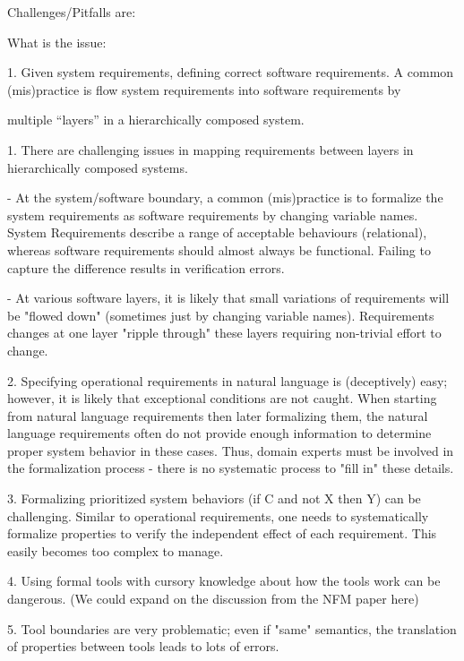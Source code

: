 Challenges/Pitfalls are:

What is the issue:

1. Given system requirements, defining correct software requirements.  A common (mis)practice is flow system requirements into software requirements by

multiple ``layers'' in a hierarchically composed system.


1. There are challenging issues in mapping requirements between layers in hierarchically composed systems.

- At the system/software boundary, a common (mis)practice is to formalize the system requirements as software requirements by changing variable names. System Requirements describe a range of acceptable behaviours (relational), whereas software requirements should almost always be functional. Failing to capture the difference results in verification errors.

- At various software layers, it is likely that small variations of requirements will be "flowed down" (sometimes just by changing variable names).  Requirements changes at one layer "ripple through" these layers requiring non-trivial effort to change.

2. Specifying operational requirements in natural language is (deceptively) easy; however, it is likely that exceptional conditions are not caught.  When starting from natural language requirements then later formalizing them, the natural language requirements often do not provide enough information to determine proper system behavior in these cases.  Thus, domain experts must be involved in the formalization process - there is no systematic process to "fill in" these details.

3. Formalizing prioritized system behaviors (if C and not X then Y) can be challenging. Similar to operational requirements, one needs to systematically formalize properties to verify the independent effect of each requirement. This easily becomes too complex to manage.

4. Using formal tools with cursory knowledge about how the tools work can be dangerous.
(We could expand on the discussion from the NFM paper here)

5. Tool boundaries are very problematic; even if "same" semantics, the translation of properties between tools
  leads to lots of errors.

\fi 